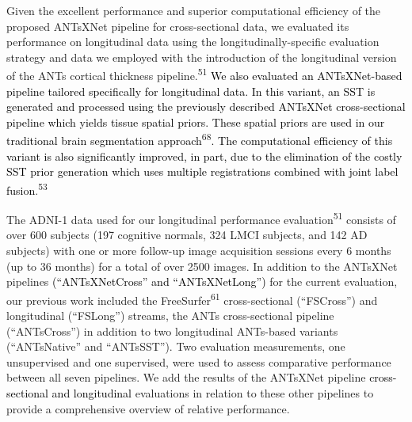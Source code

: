 \documentclass[
  12pt,
]{article}
\begin{document}
Given the excellent performance and superior computational efficiency of
the proposed ANTsXNet pipeline for cross-sectional data, we evaluated
its performance on longitudinal data using the longitudinally-specific
evaluation strategy and data we employed with the introduction of the
longitudinal version of the ANTs cortical thickness
pipeline.\textsuperscript{51} \textcolor{black}{
We also evaluated an ANTsXNet-based pipeline tailored specifically for longitudinal
data.  In this variant, an SST is generated and processed using the previously
described ANTsXNet cross-sectional pipeline which yields tissue spatial priors.
These spatial priors are used in our traditional brain segmentation approach}\textsuperscript{68}\textcolor{black}{.  The computational efficiency of this variant is also
significantly improved, in part, due to the elimination of the costly SST prior generation
which uses multiple registrations combined with joint label fusion}.\textsuperscript{53}

The ADNI-1 data used for our longitudinal performance
evaluation\textsuperscript{51} consists of over 600 subjects (197
cognitive normals, 324 LMCI subjects, and 142 AD subjects) with one or
more follow-up image acquisition sessions every 6 months (up to 36
months) for a total of over 2500 images. In addition to the ANTsXNet
pipelines \textcolor{black}{(``ANTsXNetCross'' and
``ANTsXNetLong'')} for the current evaluation, our previous work
included the FreeSurfer\textsuperscript{61} cross-sectional
(``FSCross'') and longitudinal (``FSLong'') streams, the ANTs
cross-sectional pipeline (``ANTsCross'') in addition to two longitudinal
ANTs-based variants (``ANTsNative'' and ``ANTsSST''). Two evaluation
measurements, one unsupervised and one supervised, were used to assess
comparative performance between all seven pipelines. We add the results
of the ANTsXNet pipeline
\textcolor{black}{cross-sectional and longitudinal} evaluations in
relation to these other pipelines to provide a comprehensive overview of
relative performance.
\end{document}
